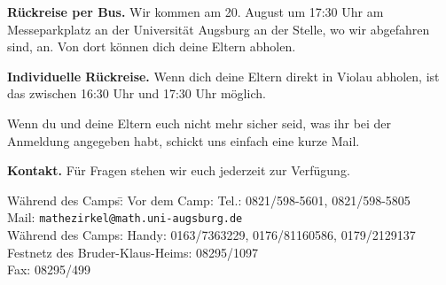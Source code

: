 \documentclass[12pt]{zettel}
\begin{document}
\begin{shaded}
\textbf{Rückreise per Bus.} Wir kommen am 20. August um 17:30 Uhr am Messeparkplatz an der Universität Augsburg an der Stelle, wo wir abgefahren sind, an. Von dort können dich deine Eltern abholen.

\textbf{Individuelle Rückreise.} Wenn dich deine Eltern direkt in Violau abholen, ist das zwischen 16:30 Uhr und 17:30 Uhr möglich.

Wenn du und deine Eltern euch nicht mehr sicher seid, was ihr bei der Anmeldung angegeben habt,
schickt uns einfach eine kurze Mail.
\end{shaded}


\begin{shaded}
\textbf{Kontakt.} Für Fragen stehen wir euch jederzeit zur Verfügung.
\begin{tabbing}
  Während des Camps:\quad \= \kill
  Vor dem Camp: \> Tel.: 0821/598-5601, 0821/598-5805 \\
  \> Mail: \texttt{mathezirkel@math.uni-augsburg.de} \\[0.5em]
  Während des Camps: \> Handy: 0163/7363229, 0176/81160586, 0179/2129137 \\
  \> Festnetz des Bruder-Klaus-Heims: 08295/1097 \\
  \> Fax: 08295/499
\end{tabbing}
\vspace{-1em}
\end{shaded}

\newpage
\end{document}
